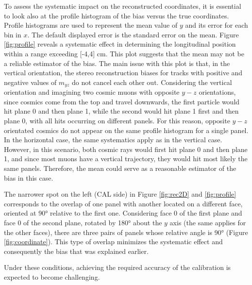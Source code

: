 To assess the systematic impact on the reconstructed coordinates, it is essential 
to look also at the profile histogram of the bias versus the true coordinates. 
Profile histograms are used to represent the mean value of $y$ and its error for each bin in $x$. 
The default displayed error is the standard error on the mean. 
Figure \ref{fig:profile} reveals a systematic effect in determining the 
longitudinal position within a range exceeding [-4,4] cm. 
This plot suggests that the mean may not be a reliable estimator 
of the bias. The main issue with this plot is that, in the vertical orientation, the stereo 
reconstruction biases for tracks with positive and negative values of 
$m_{yz}$ do not cancel each other out.
Considering the vertical orientation and imagining two cosmic muons  
with opposite $y-z$ orientations, since cosmics come from the top and travel 
downwards, the first particle would hit plane 0 and then plane 1, while the second 
would hit plane 1 first and then plane 0, with all hits occurring on different 
panels. For this reason, opposite $y-z$ orientated cosmics do not appear on the same profile 
histogram for a single panel. In the horizontal case, the same systematics apply as in the vertical case. 
However, in this scenario, both cosmic rays would first hit plane 0 and then 
plane 1, and since most muons have a vertical trajectory, they would hit most likely  
the same panels. Therefore, the mean could serve as a reasonable estimator of the bias in this case.

The narrower spot on the left (CAL side) in Figure \ref{fig:rec2D} and \ref{fig:profile} 
corresponds to the overlap of one panel with another located 
on a different face, oriented at 90° relative to the first one. 
Considering face 0 of the first plane and face 0 of the second plane, 
rotated by 180° about the $y$ axis (the same applies for the other faces), 
there are three pairs of panels whose relative angle is 90° (Figure \ref{fig:coordinate}). 
This type of overlap minimizes the systematic effect and consequently the bias that was explained earlier.

Under these conditions, achieving the required accuracy 
of the calibration is expected to become challenging. 


  
